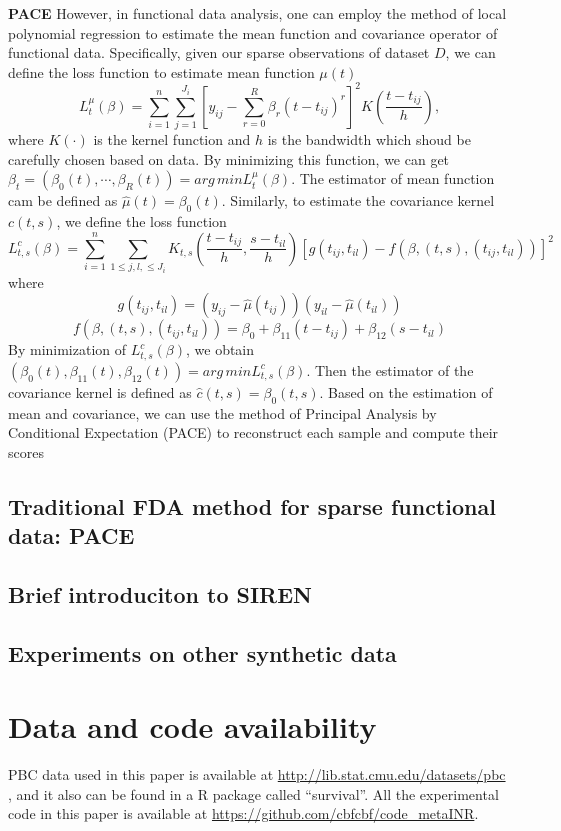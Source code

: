 \documentclass{article}
\begin{document}
\textbf{PACE}
However, in functional data analysis, one can employ the method of local polynomial regression to estimate the mean function and covariance operator of functional data.
Specifically, given our sparse observations of dataset $D$,
we can define the loss function to estimate mean function $\mu(t)$
$$
L_t^\mu(\beta)=\sum_{i=1}^n\sum_{j=1}^{J_i}\left[y_{ij}-\sum_{r=0}^R \beta_r\left(t-t_{ij}\right)^r\right]^2 K\left(\frac{t-t_{ij}}{h}\right),
$$
where $K(\cdot)$ is the kernel function and $h$ is the bandwidth which shoud be carefully chosen based on data.
By minimizing this function, we can get
$\beta_t=(\beta_0(t), \cdots, \beta_R(t))=arg\,min L_t^\mu(\beta)$. The estimator of mean function cam be defined as $\hat{\mu}(t)=\beta_0(t)$.
Similarly, to estimate the covariance kernel $c(t,s)$, we define the loss function 
$$
L^c_{t,s}(\beta)=\sum_{i=1}^n \sum_{1\leq j, l, \leq J_i} K_{t,s}(\frac{t-t_{ij}}{h}, \frac{s-t_{il}}{h}) \left[ g(t_{ij},t_{il})-f\left(\beta,(t,s),(t_{ij},t_{il})\right) \right]^2
$$
where
$$
g(t_{ij},t_{il})=(y_{ij}-\hat{\mu}(t_{ij}))(y_{il}-\hat{\mu}(t_{il}))
$$
$$
f\left(\beta,(t,s),(t_{ij},t_{il})\right)=\beta_0 + \beta_{11}(t-t_{ij})+\beta_{12}(s-t_{il})
$$
By minimization of $L_{t,s}^c(\beta)$, we obtain $(\beta_0(t),\beta_{11}(t),\beta_{12}(t))=arg\,min L_{t,s}^c(\beta)$. Then the estimator of the covariance kernel is defined as $\hat{c}(t,s)=\beta_0(t,s)$.
Based on the estimation of mean and covariance,  we can use the method of Principal Analysis by Conditional Expectation (PACE) to reconstruct each sample and compute their scores 


\subsection{Traditional FDA method for sparse functional data: PACE}

\subsection{Brief introduciton to SIREN}

\subsection{Experiments on other synthetic data}

\section*{Data and code availability}
PBC data used in this paper is available at \url{http://lib.stat.cmu.edu/datasets/pbc} , and it also can be found in a R package called ``survival''.
All the experimental code in this paper is available at \url{https://github.com/cbfcbf/code\_metaINR}.
\end{document}
